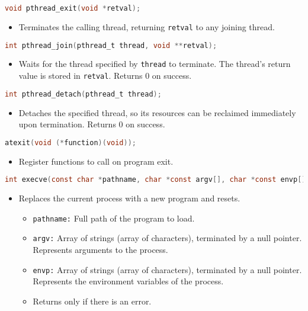\documentclass[twoside]{article}
\begin{document}
\begin{summary}
\begin{lstlisting}[language=C]
void pthread_exit(void *retval);
\end{lstlisting}
    \begin{itemize}
        \item Terminates the calling thread, returning \texttt{retval} to any joining thread. 
    \end{itemize}
    
\begin{lstlisting}[language=C]
int pthread_join(pthread_t thread, void **retval);
\end{lstlisting}
    \begin{itemize}
        \item Waits for the thread specified by \texttt{thread} to terminate. The thread's return value is stored in \texttt{retval}. Returns 0 on success.
    \end{itemize}
    
\begin{lstlisting}[language=C]
int pthread_detach(pthread_t thread);
\end{lstlisting}
    \begin{itemize}
        \item Detaches the specified thread, so its resources can be reclaimed immediately upon termination. Returns 0 on success.
    \end{itemize}  
    
\begin{lstlisting}[language=C]
atexit(void (*function)(void));
\end{lstlisting}
    \begin{itemize}
        \item Register functions to call on program exit.
    \end{itemize}

\begin{lstlisting}[language=C]
int execve(const char *pathname, char *const argv[], char *const envp[]);
\end{lstlisting}
    \begin{itemize}
        \item Replaces the current process with a new program and resets. 
        \begin{itemize}
            \item \texttt{pathname:} Full path of the program to load. 
            \item \texttt{argv:} Array of strings (array of characters), terminated by a null pointer. Represents arguments to the process.
            \item \texttt{envp:} Array of strings (array of characters), terminated by a null pointer. Represents the environment variables of the process.
            \item Returns only if there is an error.
        \end{itemize}
    \end{itemize}


\end{summary}
\end{document}
